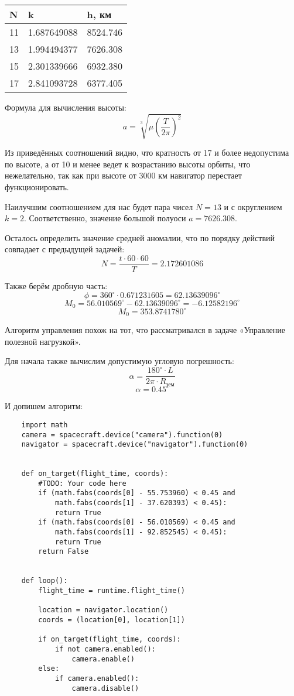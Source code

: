 \begin{tabular}{ |l |l |l |}
    \hline
    N & k & h, км\\
    \hline
    11	& 1.687649088	& 8524.746\\
    \hline
    13	& 1.994494377	& 7626.308\\
    \hline
    15	& 2.301339666	& 6932.380\\
    \hline
    17	& 2.841093728	& 6377.405\\
    \hline
\end{tabular}

Формула для вычисления высоты:
$$a=\sqrt[3]{\mu\left(\frac{T}{2\pi}\right)^2}$$

Из приведённых соотношений видно, что кратность от 17 и 
более недопустима по высоте, а от 10 и менее ведет к 
возрастанию высоты орбиты, что нежелательно, так как 
при высоте от 3000 км навигатор перестает функционировать.

Наилучшим соотношением для нас будет пара чисел $N=13$ и с 
округлением $k=2$. Соответственно, значение большой полуоси 
$a=7626.308$.

Осталось определить значение средней аномалии, что по 
порядку действий совпадает с предыдущей задачей:
$$N = \frac{t \cdot 60 \cdot 60}{T} = 2.172601086$$

Также берём дробную часть:
$$\phi = 360^\circ \cdot 0.671231605 = 62.13639096^\circ$$
$$M_0 = 56.010569^\circ -  62.13639096^\circ = -6.12582196^\circ$$
$$M_0 = 353.8741780^\circ$$

Алгоритм управления похож на тот, что рассматривался в задаче 
«Управление полезной нагрузкой».

Для начала также вычислим допустимую угловую погрешность:
$$\alpha=\frac{180^\circ\cdot L}{2\pi \cdot R_\text{зем}}$$
$$\alpha = 0.45^\circ$$

И допишем алгоритм:

\begin{verbatim}
    import math
    camera = spacecraft.device("camera").function(0)
    navigator = spacecraft.device("navigator").function(0)


    def on_target(flight_time, coords):
        #TODO: Your code here
        if (math.fabs(coords[0] - 55.753960) < 0.45 and 
            math.fabs(coords[1] - 37.620393) < 0.45):
            return True
        if (math.fabs(coords[0] - 56.010569) < 0.45 and 
            math.fabs(coords[1] - 92.852545) < 0.45):
            return True
        return False


    def loop():
        flight_time = runtime.flight_time()

        location = navigator.location()
        coords = (location[0], location[1])

        if on_target(flight_time, coords):
            if not camera.enabled():
                camera.enable()
        else:
            if camera.enabled():
                camera.disable()

\end{verbatim}

